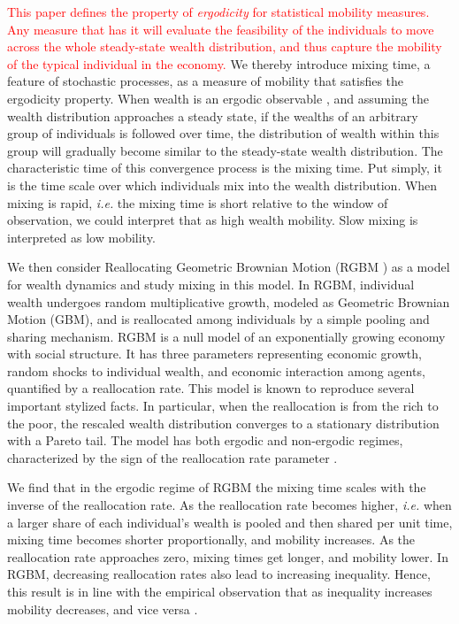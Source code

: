 \documentclass[11pt]{article}
\newcommand{\ie}{{\it i.e.}\xspace}
\numberwithin{equation}{section}
\begin{document}
\textcolor{red}{This paper defines the property of \textit{ergodicity} for statistical mobility measures. Any measure that has it will evaluate the feasibility of the individuals to move across the whole steady-state wealth distribution, and thus capture the mobility of the typical individual in the economy.} We thereby introduce mixing time, a feature of stochastic processes, as a measure of mobility that satisfies the ergodicity property. When wealth is an ergodic observable \citep{PetersAdamou2018c}, and assuming the wealth distribution approaches a steady state, if the wealths of an arbitrary group of individuals is followed over time, the distribution of wealth within this group will gradually become similar to the steady-state wealth distribution. The characteristic time of this convergence process is the mixing time. Put simply, it is the time scale over which individuals mix into the wealth distribution. When mixing is rapid, \ie the mixing time is short relative to the window of observation, we could interpret that as high wealth mobility. Slow mixing is interpreted as low mobility.

We then consider Reallocating Geometric Brownian Motion (RGBM \citep{MarsiliMaslovZhang1998,LiuSerota2017,BermanPetersAdamou2019}) as a model for wealth dynamics and study mixing in this model. In RGBM, individual wealth undergoes random multiplicative growth, modeled as Geometric Brownian Motion (GBM), and is reallocated among individuals by a simple pooling and sharing mechanism. RGBM is a null model of an exponentially growing economy with social structure. It has three parameters representing economic growth, random shocks to individual wealth, and economic interaction among agents, quantified by a reallocation rate. This model is known to reproduce several important stylized facts. In particular, when the reallocation is from the rich to the poor, the rescaled wealth distribution converges to a stationary distribution with a Pareto tail. The model has both ergodic and non-ergodic regimes, characterized by the sign of the reallocation rate parameter \citep{BermanPetersAdamou2019}.

We find that in the ergodic regime of RGBM the mixing time scales with the inverse of the reallocation rate. As the reallocation rate becomes higher, \ie when a larger share of each individual's wealth is pooled and then shared per unit time, mixing time becomes shorter proportionally, and mobility increases. As the reallocation rate approaches zero, mixing times get longer, and mobility lower. In RGBM, decreasing reallocation rates also lead to increasing inequality. Hence, this result is in line with the empirical observation that as inequality increases mobility decreases, and vice versa \citep{corak2013}. %
\end{document}

